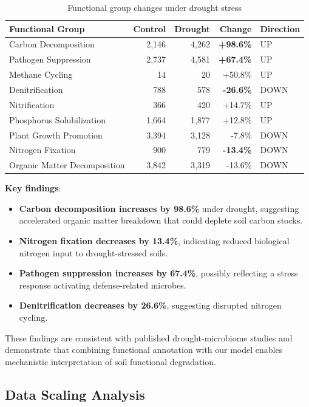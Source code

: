 \documentclass[11pt,a4paper]{article}
\begin{document}
\begin{table}[H]
\centering
\caption{Functional group changes under drought stress}
\label{tab:function}
\begin{tabular}{lrrrl}
\toprule
\textbf{Functional Group} & \textbf{Control} & \textbf{Drought} & \textbf{Change} & \textbf{Direction} \\
\midrule
Carbon Decomposition & 2,146 & 4,262 & \textbf{+98.6\%} & UP \\
Pathogen Suppression & 2,737 & 4,581 & \textbf{+67.4\%} & UP \\
Methane Cycling & 14 & 20 & +50.8\% & UP \\
Denitrification & 788 & 578 & \textbf{-26.6\%} & DOWN \\
Nitrification & 366 & 420 & +14.7\% & UP \\
Phosphorus Solubilization & 1,664 & 1,877 & +12.8\% & UP \\
Plant Growth Promotion & 3,394 & 3,128 & -7.8\% & DOWN \\
Nitrogen Fixation & 900 & 779 & \textbf{-13.4\%} & DOWN \\
Organic Matter Decomposition & 3,842 & 3,319 & -13.6\% & DOWN \\
\bottomrule
\end{tabular}
\end{table}

\textbf{Key findings}:
\begin{itemize}[leftmargin=1.5em]
    \item \textbf{Carbon decomposition increases by 98.6\%} under drought, suggesting accelerated organic matter breakdown that could deplete soil carbon stocks.
    \item \textbf{Nitrogen fixation decreases by 13.4\%}, indicating reduced biological nitrogen input to drought-stressed soils.
    \item \textbf{Pathogen suppression increases by 67.4\%}, possibly reflecting a stress response activating defense-related microbes.
    \item \textbf{Denitrification decreases by 26.6\%}, suggesting disrupted nitrogen cycling.
\end{itemize}

These findings are consistent with published drought-microbiome studies and demonstrate that combining functional annotation with our model enables mechanistic interpretation of soil functional degradation.

\subsection{Data Scaling Analysis}
\end{document}
